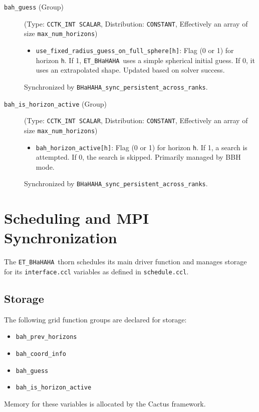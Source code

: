 \documentclass[a4paper,11pt]{article}
\newcommand{\thorn}[1]{{\tt #1}}
\newcommand{\file}[1]{{\tt #1}}
\newcommand{\BHaHAHA}{\thorn{ET\_BHaHAHA}} %
\begin{document}
\begin{description}
    \item[\texttt{bah\_guess} (Group)] (Type: \texttt{CCTK\_INT SCALAR}, Distribution: \texttt{CONSTANT}, Effectively an array of size \texttt{max\_num\_horizons}) \\
        \begin{itemize}
            \item \texttt{use\_fixed\_radius\_guess\_on\_full\_sphere[h]}: Flag (0 or 1) for horizon \texttt{h}. If 1, \BHaHAHA\ uses a simple spherical initial guess. If 0, it uses an extrapolated shape. Updated based on solver success.
        \end{itemize}
        Synchronized by \texttt{BHaHAHA\_sync\_persistent\_across\_ranks}.

    \item[\texttt{bah\_is\_horizon\_active} (Group)] (Type: \texttt{CCTK\_INT SCALAR}, Distribution: \texttt{CONSTANT}, Effectively an array of size \texttt{max\_num\_horizons}) \\
        \begin{itemize}
            \item \texttt{bah\_horizon\_active[h]}: Flag (0 or 1) for horizon \texttt{h}. If 1, a search is attempted. If 0, the search is skipped. Primarily managed by BBH mode.
        \end{itemize}
        Synchronized by \texttt{BHaHAHA\_sync\_persistent\_across\_ranks}.
\end{description}

\section{Scheduling and MPI Synchronization}
\label{sec:scheduling_mpi}
The \BHaHAHA\ thorn schedules its main driver function and manages storage for its \texttt{interface.ccl} variables as defined in \file{schedule.ccl}.

\subsection{Storage}
The following grid function groups are declared for storage:
\begin{itemize}
    \item \texttt{bah\_prev\_horizons}
    \item \texttt{bah\_coord\_info}
    \item \texttt{bah\_guess}
    \item \texttt{bah\_is\_horizon\_active}
\end{itemize}
Memory for these variables is allocated by the Cactus framework.
\end{document}
